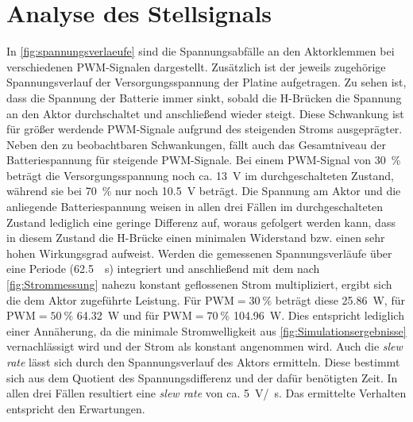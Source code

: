 \section{Analyse des Stellsignals}
In \autoref{fig:spannungsverlaeufe} sind die Spannungsabfälle an den Aktorklemmen bei verschiedenen PWM-Signalen dargestellt. Zusätzlich ist der jeweils zugehörige Spannungsverlauf der Versorgungsspannung der Platine aufgetragen. Zu sehen ist, dass die Spannung der Batterie immer sinkt, sobald die H-Brücken die Spannung an den Aktor durchschaltet und anschließend wieder steigt. Diese Schwankung ist für größer werdende PWM-Signale aufgrund des steigenden Stroms ausgeprägter. Neben den zu beobachtbaren Schwankungen, fällt auch das Gesamtniveau der Batteriespannung für steigende PWM-Signale. Bei einem PWM-Signal von \SI{30}{\%} beträgt die Versorgungsspannung noch ca. \SI{13}{V} im durchgeschalteten Zustand, während sie bei \SI{70}{\%} nur noch \SI{10,5}{V} beträgt. Die Spannung am Aktor und die anliegende Batteriespannung weisen in allen drei Fällen im durchgeschalteten Zustand lediglich eine geringe Differenz auf, woraus gefolgert werden kann, dass in diesem Zustand die H-Brücke einen minimalen Widerstand bzw. einen sehr hohen Wirkungsgrad aufweist. Werden die gemessenen Spannungsverläufe über eine Periode (\SI{62,5}{\mu s}) integriert und anschließend mit dem nach \autoref{fig:Strommessung} nahezu konstant geflossenen Strom multipliziert, ergibt sich die dem Aktor zugeführte Leistung. Für $\text{PWM}=\SI{30}{\%}$ beträgt diese \SI{25,86}{W}, für $\text{PWM}=\SI{50}{\%}$ \SI{64,32}{W} und für $\text{PWM}=\SI{70}{\%}$ \SI{104,96}{W}. Dies entspricht lediglich einer Annäherung, da die minimale Stromwelligkeit aus \autoref{fig:Simulationsergebnisse} vernachlässigt wird und der Strom als konstant angenommen wird.
Auch die \textit{slew rate} lässt sich durch den Spannungsverlauf des Aktors ermitteln. Diese bestimmt sich aus dem Quotient des Spannungsdifferenz und der dafür benötigten Zeit. In allen drei Fällen resultiert eine \textit{slew rate} von ca. \SI{5}{V/\mu s}. Das ermittelte Verhalten entspricht den Erwartungen.


